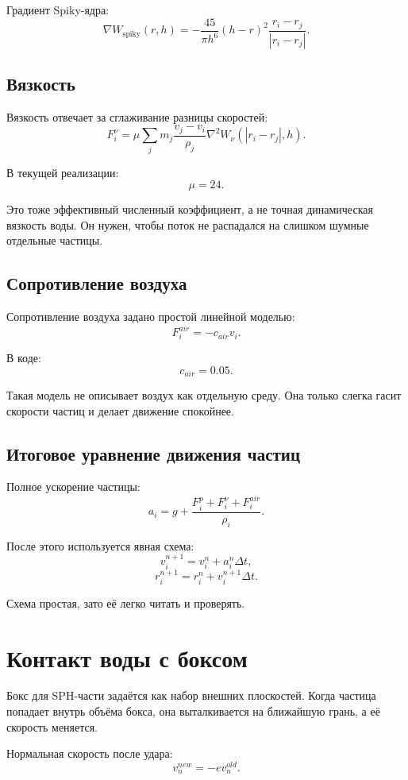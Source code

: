 \documentclass[12pt,a4paper]{article}
\begin{document}
Градиент Spiky-ядра:
\[
\nabla W_{\text{spiky}}(r,h)
=
-\frac{45}{\pi h^6}(h-r)^2 \frac{r_i-r_j}{|r_i-r_j|}.
\]

\subsection{Вязкость}

Вязкость отвечает за сглаживание разницы скоростей:
\[
F_i^{\nu} =
\mu \sum_j m_j
\frac{v_j-v_i}{\rho_j}
\nabla^2 W_{\nu}(|r_i-r_j|,h).
\]

В текущей реализации:
\[
\mu = 24.
\]

Это тоже эффективный численный коэффициент, а не точная динамическая вязкость
воды. Он нужен, чтобы поток не распадался на слишком шумные отдельные частицы.

\subsection{Сопротивление воздуха}

Сопротивление воздуха задано простой линейной моделью:
\[
F_i^{air} = -c_{air} v_i.
\]

В коде:
\[
c_{air}=0.05.
\]

Такая модель не описывает воздух как отдельную среду. Она только слегка гасит
скорости частиц и делает движение спокойнее.

\subsection{Итоговое уравнение движения частиц}

Полное ускорение частицы:
\[
a_i =
g
+
\frac{F_i^p + F_i^\nu + F_i^{air}}{\rho_i}.
\]

После этого используется явная схема:
\[
v_i^{n+1} = v_i^n + a_i^n \Delta t,
\]
\[
r_i^{n+1} = r_i^n + v_i^{n+1}\Delta t.
\]

Схема простая, зато её легко читать и проверять.

\section{Контакт воды с боксом}

Бокс для SPH-части задаётся как набор внешних плоскостей. Когда частица попадает
внутрь объёма бокса, она выталкивается на ближайшую грань, а её скорость
меняется.

Нормальная скорость после удара:
\[
v_n^{new} = -e v_n^{old}.
\]
\end{document}
